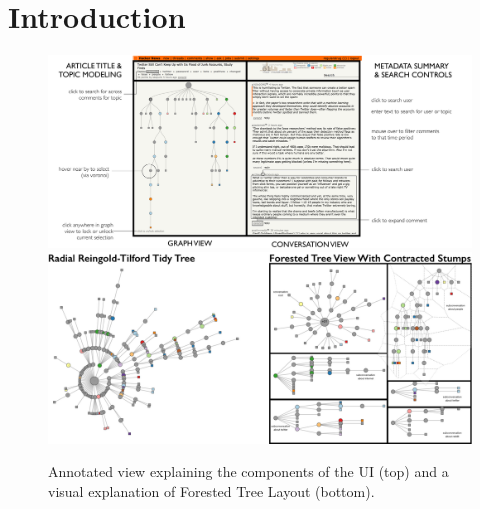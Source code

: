 \documentclass{egpubl}
\begin{document}
\section{Introduction}


\begin{figure}[htb]
\centering
\includegraphics[width=0.9\linewidth]{images/explainer.pdf}
\includegraphics[width=0.9\linewidth]{images/forested-tree-view-example.png}
%
%
\caption{
\label{fig:explainer}
Annotated view explaining the components of the UI (top) and a visual explanation of Forested Tree Layout (bottom). 
}
\end{figure}
\end{document}
